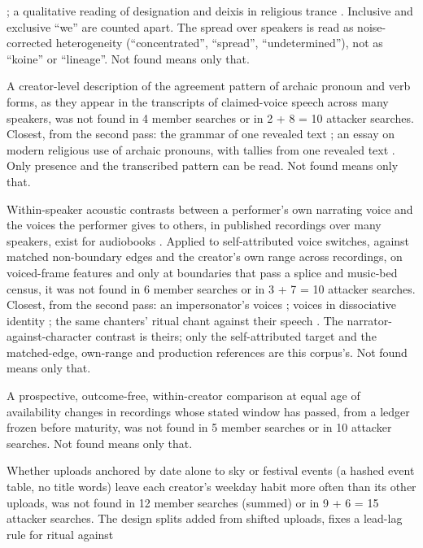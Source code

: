 {\begin{description}
\cite{p12magyari2022hungarian}; a qualitative reading of designation and deixis in religious trance
\cite{p12silva2026mesmo}. Inclusive and exclusive ``we'' are counted apart. The spread over speakers is read as
noise-corrected heterogeneity (``concentrated'', ``spread'', ``undetermined''), not as ``koine'' or ``lineage''. Not
found means only that.
\item[N12.] A creator-level description of the agreement pattern of archaic pronoun and verb forms, as they appear in
the transcripts of claimed-voice speech across many speakers, was not found in 4 member searches or in 2 + 8 = 10
attacker searches. Closest, from the second pass: the grammar of one revealed text \cite{p12carmack2018book}; an
essay on modern religious use of archaic pronouns, with tallies from one revealed text \cite{p12terry2014thou}. Only
presence and the transcribed pattern can be read. Not found means only that.
\item[N13.] Within-speaker acoustic contrasts between a performer's own narrating voice and the voices the performer
gives to others, in published recordings over many speakers, exist for audiobooks
\cite{p12pethe2025prosody,p12michel2026computational}. Applied to self-attributed voice switches, against matched
non-boundary edges and the creator's own range across recordings, on voiced-frame features and only at boundaries that
pass a splice and music-bed census, it was not found in 6 member searches or in 3 + 7 = 10 attacker searches. Closest,
from the second pass: an impersonator's voices \cite{p12revis2013vocal}; voices in dissociative identity
\cite{p12sawaguchi2018approach}; the same chanters' ritual chant against their speech \cite{p12nwosu2026owl}. The
narrator-against-character contrast is theirs; only the self-attributed target and the matched-edge, own-range and
production references are this corpus's. Not found means only that.
\item[N18 (round~4 form).] A prospective, outcome-free, within-creator comparison at equal age of availability changes
in recordings whose stated window has passed, from a ledger frozen before maturity, was not found in 5 member searches
or in 10 attacker searches. Not found means only that.
\item[N19.] Whether uploads anchored by date alone to sky or festival events (a hashed event table, no title words)
leave each creator's weekday habit more often than its other uploads, was not found in 12 member searches (summed) or
in 9 + 6 = 15 attacker searches. The design splits added from shifted uploads, fixes a lead-lag rule for ritual against

\end{description}}
